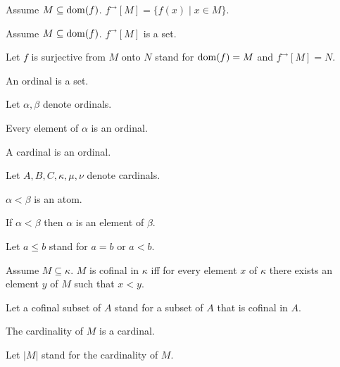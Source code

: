 \documentclass{article}
\newcommand{\image}[2]{#1^{\to}[#2]}
\newcommand{\card}[1]{\left|#1\right|}
\begin{document}
\begin{forthel}
    \begin{definition}
      Assume $M\subseteq \operatorname{dom}(f)$.
      $\image{f}{M} = \{f(x) \mid x \in M\}$.
    \end{definition}

    \begin{axiom}
      Assume $M\subseteq \operatorname{dom}(f)$.
      $\image{f}{M}$ is a set.
    \end{axiom}

    Let $f$ is surjective from $M$ onto $N$ stand for $\operatorname{dom}(f) = M$ and $\image{f}{M} = N$.

    \begin{signature}
      An ordinal is a set.
    \end{signature}

    Let $\alpha, \beta$ denote ordinals.

    \begin{axiom}
      Every element of $\alpha$ is an ordinal.
    \end{axiom}

    \begin{signature}
      A cardinal is an ordinal.
    \end{signature}

    Let $A,B,C,\kappa, \mu, \nu$ denote cardinals.

    \begin{signature}
      $\alpha < \beta$ is an atom.
    \end{signature}

    \begin{axiom}
      If $\alpha < \beta$ then $\alpha$ is an element of $\beta$.
    \end{axiom}

    Let $a \leq b$ stand for $a = b$ or $a < b$.

    \begin{definition}
      Assume $M\subseteq \kappa$.
      $M$ is cofinal in $\kappa$ iff
        for every element $x$ of $\kappa$ there exists an element $y$ of $M$ such that $x < y$.
    \end{definition}

    Let a cofinal subset of $A$ stand for a subset of $A$ that is cofinal in $A$.

    \begin{signature}
      The cardinality of $M$ is a cardinal.
    \end{signature}

    Let $\card{M}$ stand for the cardinality of $M$.


\end{forthel}
\end{document}

